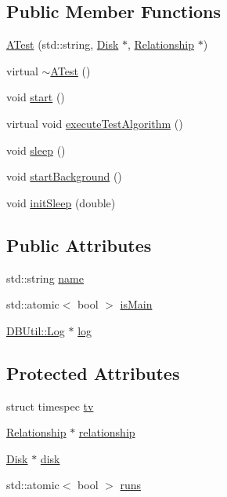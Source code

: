 \subsection*{Public Member Functions}
\begin{DoxyCompactItemize}
\item 
\hyperlink{class_h_d_d_test_1_1_a_test_af07238e3cb280500d2c32968bd798b3b}{A\-Test} (std\-::string, \hyperlink{class_h_d_d_test_1_1_disk}{Disk} $\ast$, \hyperlink{class_h_d_d_test_1_1_relationship}{Relationship} $\ast$)
\item 
virtual \hyperlink{class_h_d_d_test_1_1_a_test_ac3b7b3b7fa2da5fa4c8b13bd95f46859}{$\sim$\-A\-Test} ()
\item 
void \hyperlink{class_h_d_d_test_1_1_a_test_a3c3ae1353dc05321bafa921ff6de4342}{start} ()
\item 
virtual void \hyperlink{class_h_d_d_test_1_1_a_test_a7dc054e211eccf42c03a6bb31d7fdc6e}{execute\-Test\-Algorithm} ()
\item 
void \hyperlink{class_h_d_d_test_1_1_a_test_a34afdf1fdbea73fd11422392eeb88320}{sleep} ()
\item 
void \hyperlink{class_h_d_d_test_1_1_a_test_ad4846b9edaba08c50795e0cb3f61c7cb}{start\-Background} ()
\item 
void \hyperlink{class_h_d_d_test_1_1_a_test_a9f790949cab92f3c110545af91cb49bf}{init\-Sleep} (double)
\end{DoxyCompactItemize}
\subsection*{Public Attributes}
\begin{DoxyCompactItemize}
\item 
std\-::string \hyperlink{class_h_d_d_test_1_1_a_test_aa7570476c8072fbbf8ec24c8f997656f}{name}
\item 
std\-::atomic$<$ bool $>$ \hyperlink{class_h_d_d_test_1_1_a_test_ac32f948a2541934bba8137e20987bf71}{is\-Main}
\item 
\hyperlink{class_d_b_util_1_1_log}{D\-B\-Util\-::\-Log} $\ast$ \hyperlink{class_h_d_d_test_1_1_a_test_a5db6314a0231c885e25a9c98ea41e95a}{log}
\end{DoxyCompactItemize}
\subsection*{Protected Attributes}
\begin{DoxyCompactItemize}
\item 
struct timespec \hyperlink{class_h_d_d_test_1_1_a_test_a2479468580e5e88344aa09eb474021a4}{tv}
\item 
\hyperlink{class_h_d_d_test_1_1_relationship}{Relationship} $\ast$ \hyperlink{class_h_d_d_test_1_1_a_test_a2c3b0b7b9ec6c37f8dce5cceba4b728e}{relationship}
\item 
\hyperlink{class_h_d_d_test_1_1_disk}{Disk} $\ast$ \hyperlink{class_h_d_d_test_1_1_a_test_a8299c80c0778b70fabcc8af49e3f0334}{disk}
\item 
std\-::atomic$<$ bool $>$ \hyperlink{class_h_d_d_test_1_1_a_test_a3b5cdf4b9fef9a7c74ec02755a08df24}{runs}
\end{DoxyCompactItemize}


